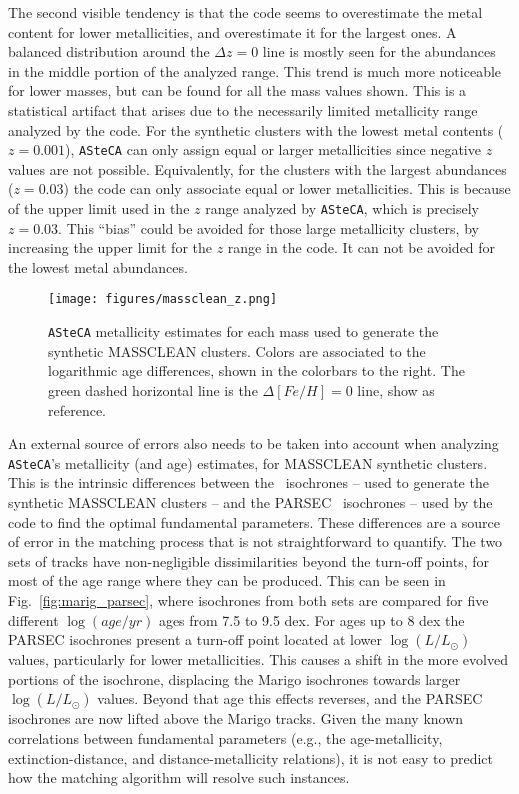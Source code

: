 \documentclass{aa}
\begin{document}
\begin{appendix}
The second visible tendency is that the code seems to overestimate the metal
content for lower metallicities, and overestimate it for the largest ones.
A balanced distribution around the $\Delta z{=}0$ line is mostly seen for the
abundances in the middle portion of the analyzed range. This trend is much more
noticeable for lower masses, but can be found for all the mass values shown.
%
This is a statistical artifact that arises due to the necessarily limited
metallicity range analyzed by the code. For the synthetic clusters with the
lowest metal contents ($z{=}0.001$), \texttt{ASteCA} can only assign equal or
larger metallicities since negative $z$ values are not possible.
Equivalently, for the clusters with the largest abundances ($z{=}0.03$) the code
can only associate equal or lower metallicities. This is because of the upper
limit used in the $z$ range analyzed by \texttt{ASteCA}, which is precisely
$z{=}0.03$.
This ``bias'' could be avoided for those large metallicity clusters, by
increasing the upper limit for the $z$ range in the code. It can not be avoided
for the lowest metal abundances.\\

\begin{figure*}
\texttt{[image: figures/massclean\_z.png]}
\caption{\texttt{ASteCA} metallicity estimates for each mass used to generate
the synthetic MASSCLEAN clusters. Colors are associated to the logarithmic age
differences, shown in the colorbars to the right. The green dashed horizontal
line is the $\Delta[Fe/H]{=}0$ line, show as reference.}
\label{fig:massclean_z}
\end{figure*}

An external source of errors also needs to be taken into account when analyzing
\texttt{ASteCA}'s metallicity (and age) estimates, for MASSCLEAN synthetic
clusters.
%
This is the intrinsic differences between the~\cite{Marigo_2008} isochrones --
used to generate the synthetic MASSCLEAN clusters -- and the
PARSEC~\citep{Bressan_2012} isochrones -- used by the code to find the optimal
fundamental parameters. These differences are a source of error in the matching
process that is not straightforward to quantify.
%
The two sets of tracks have non-negligible dissimilarities beyond the turn-off
points, for most of the age range where they can be produced. This can be seen
in Fig.~\ref{fig:marig_parsec}, where isochrones from both sets are compared for
five different $\log(age/yr)$ ages from 7.5 to 9.5 dex.
%
For ages up to 8 dex the PARSEC isochrones present a turn-off point located at
lower $\log(L/L_{\odot})$ values, particularly for lower metallicities. This
causes a shift in the more evolved portions of the isochrone, displacing the
Marigo isochrones towards larger $\log(L/L_{\odot})$ values.
%
Beyond that age this effects reverses, and the PARSEC isochrones are now lifted
above the Marigo tracks. Given the many known correlations between fundamental
parameters (e.g., the age-metallicity, extinction-distance, and
distance-metallicity relations), it is not easy to predict how the matching
algorithm will resolve such instances.


\end{appendix}
\end{document}
